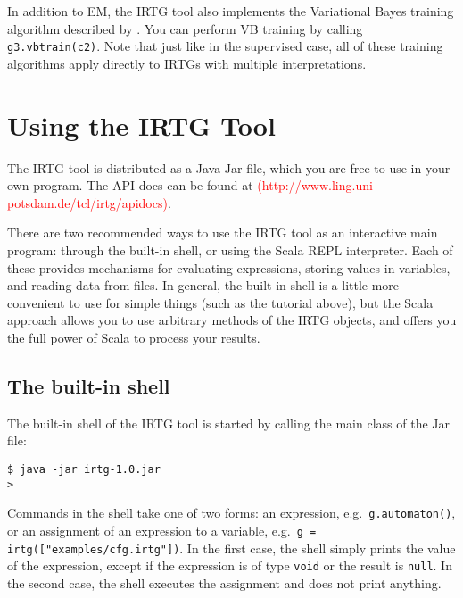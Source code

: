 \documentclass[11pt]{article}
\newcommand{\todo}[1]{\textcolor{red}{(#1)}}
\begin{document}
In addition to EM, the IRTG tool also implements the Variational Bayes
training algorithm described by
\citet{jones12:_seman_parsin_bayes_tree_trans}.  You can perform VB
training by calling \verb?g3.vbtrain(c2)?.  Note that just like in the
supervised case, all of these training algorithms apply directly to
IRTGs with multiple interpretations.



\section{Using the IRTG Tool} \label{sec:using}

The IRTG tool is distributed as a Java Jar file, which you are free to
use in your own program. The API docs can be found at
\todo{http://www.ling.uni-potsdam.de/tcl/irtg/apidocs}.

There are two recommended ways to use the IRTG tool as an interactive
main program: through the built-in shell, or using the Scala REPL
interpreter.  Each of these provides mechanisms for evaluating
expressions, storing values in variables, and reading data from files.
In general, the built-in shell is a little more convenient to use for
simple things (such as the tutorial above), but the Scala approach
allows you to use arbitrary methods of the IRTG objects, and offers
you the full power of Scala to process your results.

\subsection{The built-in shell}

The built-in shell of the IRTG tool is started by calling the main
class of the Jar file:

\begin{verbatim}
$ java -jar irtg-1.0.jar
> 
\end{verbatim}

Commands in the shell take one of two forms: an expression, e.g.\
\verb?g.automaton()?, or an assignment of an expression to a variable,
e.g.\ \verb?g = irtg(["examples/cfg.irtg"])?.  In the first case, the
shell simply prints the value of the expression, except if the
expression is of type \verb?void? or the result is \verb?null?. In the
second case, the shell executes the assignment and does not print
anything.
\end{document}

